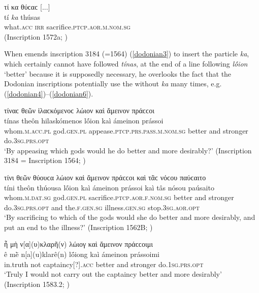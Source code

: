 \begin{exe}
\ex τί κα θύϲαϲ {[}...{]}\\
\gll tí \emph{ka} thúsas\\
what.\textsc{acc} \textsc{irr} sacrifice.\textsc{ptcp.aor.m.nom.sg}\\
\trans (Inscription 1572a; \citealp{Hoffmann1890})
\label{dodonian2}
\end{exe}

When \citet[82--83]{Blass1888} emends inscription 3184 (=1564) (\ref{dodonian3}) to insert the particle \textit{ka}, which certainly cannot have followed \textit{tínas}, at the end of a line following \textit{lṓion} `better' because it is supposedly necessary, he overlooks the fact that the Dodonian inscriptions potentially use the  without \textit{ka} many times, e.g. (\ref{dodonian4})--(\ref{dodonian6}).

\begin{exe}
\ex τίναϲ θεῶν ἱλαϲκόμενοϲ λώιον καὶ ἄμεινον πράϲϲοι\\
\gll tínas theôn hilaskómenos lṓion kaì ámeinon prássoi\\
whom.\textsc{m.acc.pl} god.\textsc{gen.pl} appease.\textsc{ptcp.prs.pass.m.nom.sg} better and stronger do.\textsc{3sg.prs.opt}\\
\trans `By appeasing which gods would he do better and more desirably?' (Inscription 3184 = Inscription 1564; \citealp{Hoffmann1890})
\label{dodonian3}
\end{exe}

\begin{exe}
\ex τίνι θεῶν θύουϲα λώιον καὶ ἄμεινον πράϲϲοι καὶ τᾶϲ νόϲου παύϲαιτο\\
\gll tíni theôn thúousa lṓion kaì ámeinon prássoi kaì tâs nósou paúsaito\\
whom.\textsc{m.dat.sg} god.\textsc{gen.pl} sacrifice.\textsc{ptcp.aor.f.nom.sg} better and stronger do.\textsc{3sg.prs.opt} and the.\textsc{f.gen.sg}
illness.\textsc{gen.sg} stop.\textsc{3sg.aor.opt}\\
\trans `By sacrificing to which of the gods would she do better and more desirably, and put an end to the illness?' (Inscription 1562B; \citealp{Hoffmann1890})
\label{dodonian4}
\end{exe}

\newpage
\begin{exe}
\ex ἦ μὴ ν{[α{]}(υ)κλαρῆ(ν) λώιογ καὶ ἄμεινον πράϲϲοιμι}\\
\gll ê mḕ n{[}a{]}(u)klarê(n) lṓiong kaì ámeinon prássoimi\\
in.truth not captaincy{[}?{]}.\textsc{acc} better and stronger do.\textsc{1sg.prs.opt}\\
\trans `Truly I would not carry out the captaincy better and more desirably' (Inscription 1583.2; \citealp{Hoffmann1890})
\label{dodonian5}
\end{exe}


